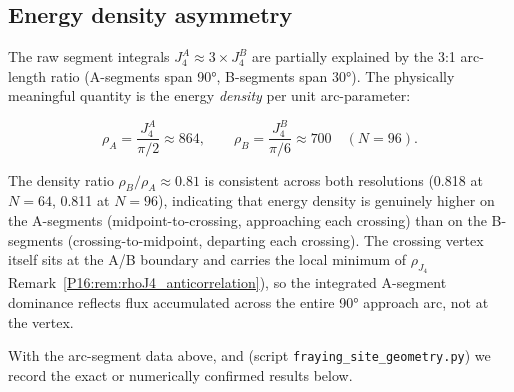 \documentclass[11pt,a4paper]{article}
\theoremstyle{definition}\newtheorem{definition}[theorem]{Definition}
\theoremstyle{remark}
\theoremstyle{definition}\newtheorem{construction}[theorem]{Construction}
\begin{document}
\subsection{Energy density asymmetry}
\label{P16:sec:arcseg_asymmetry}

The raw segment integrals $J_4^{A} \approx 3 \times J_4^{B}$ are
partially explained by the 3:1 arc-length ratio (A-segments span 90°,
B-segments span 30°).  The physically meaningful quantity is the
energy \emph{density} per unit arc-parameter:

\begin{equation}
  \rho_A = \frac{J_4^A}{\pi/2} \approx 864,\qquad
  \rho_B = \frac{J_4^B}{\pi/6} \approx 700 \quad (N=96).
\end{equation}

The density ratio $\rho_B/\rho_A \approx 0.81$ is consistent across
both resolutions (0.818 at $N=64$, 0.811 at $N=96$), indicating that
energy density is genuinely higher on the A-segments (midpoint-to-crossing,
approaching each crossing) than on the B-segments (crossing-to-midpoint,
departing each crossing).  The crossing vertex itself sits at the A/B
boundary and carries the local minimum of $\rho_{J_4}$ 
Remark~\ref{P16:rem:rhoJ4_anticorrelation}), so the integrated A-segment
dominance reflects flux accumulated across the entire 90° approach arc,
not at the vertex.

With the arc-segment data above, and (script \texttt{fraying\_site\allowbreak\_geometry.py})
we record the exact or numerically confirmed results below.
\end{document}
